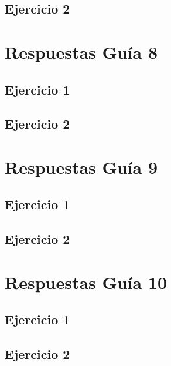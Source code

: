 \subsection{Ejercicio 2}
\newpage
\section{Respuestas Guía 8}
\subsection{Ejercicio 1}
\newpage
\subsection{Ejercicio 2}
\newpage
\section{Respuestas Guía 9}
\subsection{Ejercicio 1}
\newpage
\subsection{Ejercicio 2}
\newpage
\section{Respuestas Guía 10}
\subsection{Ejercicio 1}
\newpage
\subsection{Ejercicio 2}
\newpage